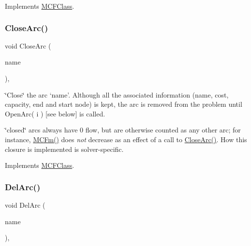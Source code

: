 Implements \mbox{\hyperlink{class_m_c_f_class_ad548db90d9914f8a40bbb4823f274ccc}{M\+C\+F\+Class}}.

\mbox{\label{class_s_p_tree_a4a964ce79159307998f5acd0018d01b1}} 
\subsubsection{\texorpdfstring{Close\+Arc()}{CloseArc()}}
{\footnotesize\ttfamily void Close\+Arc (\begin{DoxyParamCaption}\item[{\mbox{\hyperlink{class_m_c_f_class_a76aaabb20535c51a2752b93f6c38fe54}{c\+Index}}}]{name }\end{DoxyParamCaption})\hspace{0.3cm}{\ttfamily [override]}, {\ttfamily [virtual]}}

\char`\"{}\+Close\char`\"{} the arc `name'. Although all the associated information (name, cost, capacity, end and start node) is kept, the arc is removed from the problem until Open\+Arc( i ) \mbox{[}see below\mbox{]} is called.

\char`\"{}closed\char`\"{} arcs always have 0 flow, but are otherwise counted as any other arc; for instance, \mbox{\hyperlink{class_m_c_f_class_ab4d5a0d0fc49882de0b4eb3146f1b7a6}{M\+C\+Fm()}} does {\itshape not} decrease as an effect of a call to \mbox{\hyperlink{class_s_p_tree_a4a964ce79159307998f5acd0018d01b1}{Close\+Arc()}}. How this closure is implemented is solver-\/specific. 

Implements \mbox{\hyperlink{class_m_c_f_class_ae1c33ba491b57343fbc157123fff5b11}{M\+C\+F\+Class}}.

\mbox{\label{class_s_p_tree_a3b6145c95b83f40a76d724eb2b92f80f}} 
\subsubsection{\texorpdfstring{Del\+Arc()}{DelArc()}}
{\footnotesize\ttfamily void Del\+Arc (\begin{DoxyParamCaption}\item[{\mbox{\hyperlink{class_m_c_f_class_a76aaabb20535c51a2752b93f6c38fe54}{c\+Index}}}]{name }\end{DoxyParamCaption})\hspace{0.3cm}{\ttfamily [override]}, {\ttfamily [virtual]}}

